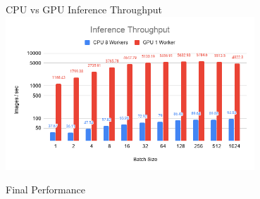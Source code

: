 \begin{frame}{CPU vs GPU Inference Throughput}
	\centering
	\includegraphics[width=0.7\textwidth]{../Images/Results/CPU-GPU-Inference-Throughput.png}\\
\end{frame}

\begin{frame}{Final Performance}
\end{frame}

